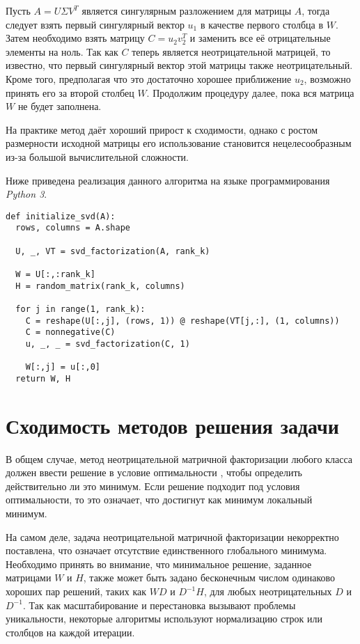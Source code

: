 Пусть $A = U \Sigma V^T $ является сингулярным разложением для матрицы $A$,
тогда следует взять первый сингулярный вектор $u_1$ в качестве первого столбца в $W$.
Затем необходимо взять матрицу $C = u_2 v_2^T$ и заменить все её отрицательные элементы на ноль.
Так как $C$ теперь является неотрицательной матрицей, то известно, что первый сингулярный вектор этой матрицы также неотрицательный.
Кроме того, предполагая что это достаточно хорошее приближение $u_2$, возможно принять его за второй столбец $W$.
Продолжим процедуру далее, пока вся матрица $W$ не будет заполнена.

На практике метод даёт хороший прирост к сходимости,
однако с ростом размерности исходной матрицы его использование становится
нецелесообразным из-за большой вычислительной сложности.


\newpage

Ниже приведена реализация данного алгоритма на языке программирования \textit{Python 3}.
\\

\begin{lstlisting}[caption=Алгоритм SVD инициализации]
def initialize_svd(A):
  rows, columns = A.shape

  U, _, VT = svd_factorization(A, rank_k)

  W = U[:,:rank_k]
  H = random_matrix(rank_k, columns)

  for j in range(1, rank_k):
    C = reshape(U[:,j], (rows, 1)) @ reshape(VT[j,:], (1, columns))
    C = nonnegative(C)
    u, _, _ = svd_factorization(C, 1)

    W[:,j] = u[:,0]
  return W, H
\end{lstlisting}




\newpage





\section{Сходимость методов решения задачи}

В общем случае, метод неотрицательной матричной факторизации любого класса
должен ввести решение в условие оптимальности \cite{chu},
чтобы определить действительно ли это минимум.
Если решение подходит под условия оптимальности, то это означает, что достигнут как минимум локальный минимум.

На самом деле, задача неотрицательной матричной факторизации некорректно поставлена,
что означает отсутствие единственного глобального минимума.
Необходимо принять во внимание, что минимальное решение, заданное матрицами $W$ и $H$,
также может быть задано бесконечным числом одинаково хороших пар решений,
таких как $WD$ и $D^{-1}H$, для любых неотрицательных $D$ и $D^{−1}$.
Так как масштабирование и перестановка вызывают проблемы уникальности,
некоторые алгоритмы используют нормализацию строк или столбцов на каждой итерации.

